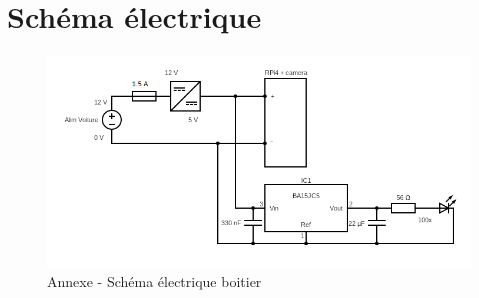 \documentclass[
    iai, %
    eai, %
]{heig-tb}
\begin{document}
\chapter{Schéma électrique}
\begin{figure}[H]
    \centering
    \includegraphics[width=\textwidth]{assets/figures/circuit.png}
    \caption{Annexe - Schéma électrique boitier}
\end{figure}

\let\cleardoublepage\clearpage
\backmatter

\label{glossaire}
\printnoidxglossary
\label{index}
\printindex

%
\end{document}
